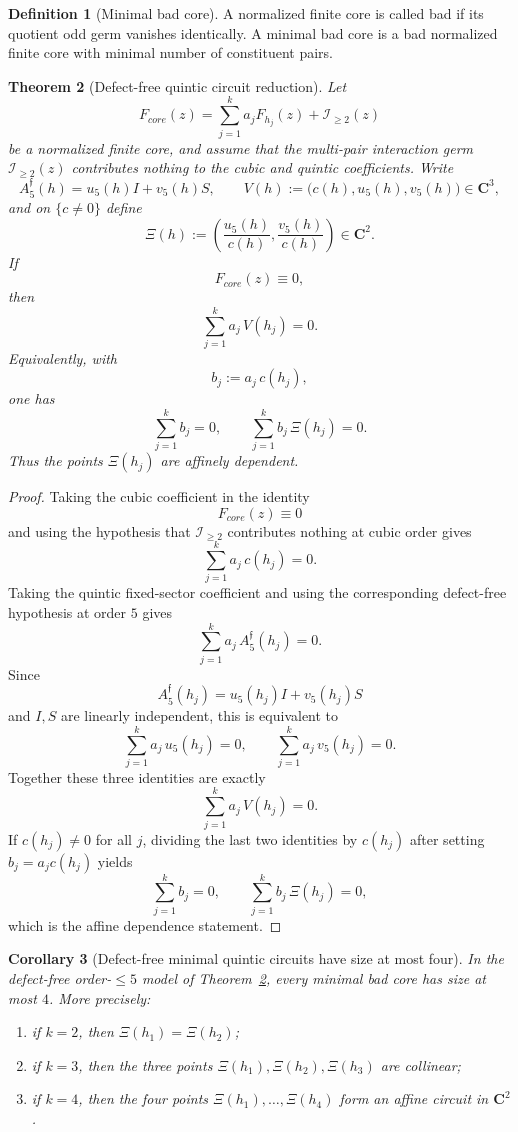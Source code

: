 \documentclass[11pt,a4paper]{amsart}
\def\core{core}%
\theoremstyle{plain}
\newtheorem{theorem}{Theorem}[section]
\newtheorem{corollary}[theorem]{Corollary}
\theoremstyle{definition}
\newtheorem{definition}[theorem]{Definition}
\newcommand{\core}{\mathrm{core}}
\begin{document}
\begin{definition}[Minimal bad core]
\label{def:minimal-bad-core}
A normalized finite core is called bad if its quotient odd germ vanishes
identically. A minimal bad core is a bad normalized finite core with minimal
number of constituent pairs.
\end{definition}

\begin{theorem}[Defect-free quintic circuit reduction]
\label{thm:defect-free-quintic-circuit-reduction}
Let
\[
F_{\core}(z)=\sum_{j=1}^k a_jF_{h_j}(z)+\mathcal I_{\ge 2}(z)
\]
be a normalized finite core, and assume that the multi-pair interaction germ
$\mathcal I_{\ge 2}(z)$ contributes nothing to the cubic and quintic
coefficients. Write
\[
A_5^{\mathfrak f}(h)=u_5(h)I+v_5(h)S,
\qquad
V(h):=\bigl(c(h),u_5(h),v_5(h)\bigr)\in\mathbf C^3,
\]
and on $\{c\neq 0\}$ define
\[
\Xi(h):=\left(\frac{u_5(h)}{c(h)},\frac{v_5(h)}{c(h)}\right)\in\mathbf C^2.
\]
If
\[
F_{\core}(z)\equiv 0,
\]
then
\[
\sum_{j=1}^k a_j\,V(h_j)=0.
\]
Equivalently, with
\[
b_j:=a_j\,c(h_j),
\]
one has
\[
\sum_{j=1}^k b_j=0,
\qquad
\sum_{j=1}^k b_j\,\Xi(h_j)=0.
\]
Thus the points $\Xi(h_j)$ are affinely dependent.
\end{theorem}

\begin{proof}
Taking the cubic coefficient in the identity
\[
F_{\core}(z)\equiv 0
\]
and using the hypothesis that $\mathcal I_{\ge2}$ contributes nothing at
cubic order gives
\[
\sum_{j=1}^k a_j\,c(h_j)=0.
\]
Taking the quintic fixed-sector coefficient and using the corresponding
defect-free hypothesis at order $5$ gives
\[
\sum_{j=1}^k a_j\,A_5^{\mathfrak f}(h_j)=0.
\]
Since
\[
A_5^{\mathfrak f}(h_j)=u_5(h_j)I+v_5(h_j)S
\]
and $I,S$ are linearly independent, this is equivalent to
\[
\sum_{j=1}^k a_j\,u_5(h_j)=0,
\qquad
\sum_{j=1}^k a_j\,v_5(h_j)=0.
\]
Together these three identities are exactly
\[
\sum_{j=1}^k a_j\,V(h_j)=0.
\]
If $c(h_j)\neq 0$ for all $j$, dividing the last two identities by
$c(h_j)$ after setting $b_j=a_jc(h_j)$ yields
\[
\sum_{j=1}^k b_j=0,
\qquad
\sum_{j=1}^k b_j\,\Xi(h_j)=0,
\]
which is the affine dependence statement.
\end{proof}

\begin{corollary}[Defect-free minimal quintic circuits have size at most four]
\label{cor:defect-free-minimal-quintic-circuits}
In the defect-free order-$\le 5$ model of
Theorem~\ref{thm:defect-free-quintic-circuit-reduction}, every minimal bad
core has size at most $4$. More precisely:
\begin{enumerate}
\item if $k=2$, then $\Xi(h_1)=\Xi(h_2)$;
\item if $k=3$, then the three points $\Xi(h_1),\Xi(h_2),\Xi(h_3)$ are
collinear;
\item if $k=4$, then the four points $\Xi(h_1),\dots,\Xi(h_4)$ form an
affine circuit in $\mathbf C^2$.
\end{enumerate}
\end{corollary}
\end{document}
